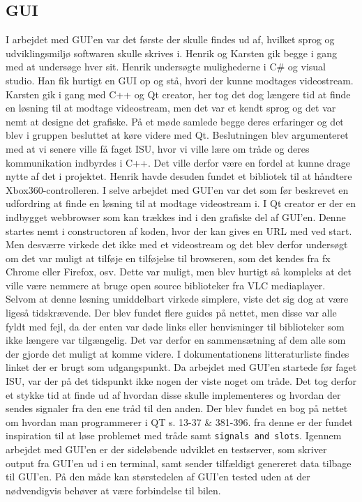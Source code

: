 \subsection{GUI}

I arbejdet med GUI’en var det første der skulle findes ud af, hvilket sprog og udviklingsmiljø softwaren skulle skrives i. Henrik og Karsten gik begge i gang med at undersøge hver sit. Henrik undersøgte mulighederne i C\# og visual studio. Han fik hurtigt en GUI op og stå, hvori der kunne modtages videostream. Karsten gik i gang med C++ og Qt creator, her tog det dog længere tid at finde en løsning til at modtage videostream, men det var et kendt sprog og det var nemt at designe det grafiske. På et møde samlede begge deres erfaringer og det blev i gruppen besluttet at køre videre med Qt. Beslutningen blev argumenteret med at vi senere ville få faget ISU, hvor vi ville lære om tråde og deres kommunikation indbyrdes i C++. Det ville derfor være en fordel at kunne drage nytte af det i projektet. Henrik havde desuden fundet et bibliotek til at håndtere Xbox360-controlleren.
I selve arbejdet med GUI’en var det som før beskrevet en udfordring at finde en løsning til at modtage videostream i. I Qt creator er der en indbygget webbrowser som kan trækkes ind i den grafiske del af GUI’en. Denne startes nemt i constructoren af koden, hvor der kan gives en URL med ved start. Men desværre virkede det ikke med et videostream og det blev derfor undersøgt om det var muligt at tilføje en tilføjelse til browseren, som det kendes fra fx Chrome eller Firefox, osv. Dette var muligt, men blev hurtigt så kompleks at det ville være nemmere at bruge open source biblioteker fra VLC mediaplayer. Selvom at denne løsning umiddelbart virkede simplere, viste det sig dog at være ligeså tidskrævende. Der blev fundet flere guides på nettet, men disse var alle fyldt med fejl, da der enten var døde links eller henvisninger til biblioteker som ikke længere var tilgængelig. Det var derfor en sammensætning af dem alle som der gjorde det muligt at komme videre. I dokumentationens litteraturliste findes linket \cite{lib:vlc-using-qt} der er brugt som udgangspunkt. 
Da arbejdet med GUI’en startede før faget ISU, var der på det tidspunkt ikke nogen der viste noget om tråde. Det tog derfor et stykke tid at finde ud af hvordan disse skulle implementeres og hvordan der sendes signaler fra den ene tråd til den anden. Der blev fundet en bog på nettet om hvordan man programmerer i QT \cite{lib:qt-bog} s. 13-37 \& 381-396. fra denne er der fundet inspiration til at løse problemet med tråde samt \texttt{signals and slots}. Igennem arbejdet med GUI'en er der sideløbende udviklet en testserver, som skriver output fra GUI'en ud i en terminal, samt sender tilfældigt genereret data tilbage til GUI'en. På den måde kan størstedelen af GUI'en tested uden at der nødvendigvis behøver at være forbindelse til bilen. 
